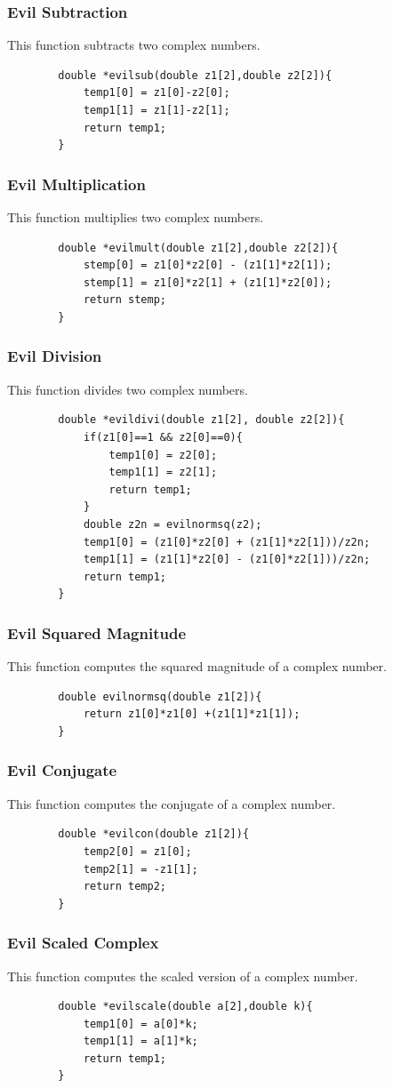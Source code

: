 \documentclass[12pt]{article}
\begin{document}
	\subsubsection{Evil Subtraction}
	This function subtracts two complex numbers.
	\begin{lstlisting}
		double *evilsub(double z1[2],double z2[2]){
			temp1[0] = z1[0]-z2[0];
			temp1[1] = z1[1]-z2[1];
			return temp1;
		}
	\end{lstlisting}
	\subsubsection{Evil Multiplication}
	This function multiplies two complex numbers.
	\begin{lstlisting}
		double *evilmult(double z1[2],double z2[2]){
			stemp[0] = z1[0]*z2[0] - (z1[1]*z2[1]);
			stemp[1] = z1[0]*z2[1] + (z1[1]*z2[0]);
			return stemp;
		}
	\end{lstlisting}
	\subsubsection{Evil Division}
	This function divides two complex numbers.
	\begin{lstlisting}
		double *evildivi(double z1[2], double z2[2]){
			if(z1[0]==1 && z2[0]==0){
				temp1[0] = z2[0];
				temp1[1] = z2[1];
				return temp1;
			}
			double z2n = evilnormsq(z2);
			temp1[0] = (z1[0]*z2[0] + (z1[1]*z2[1]))/z2n;
			temp1[1] = (z1[1]*z2[0] - (z1[0]*z2[1]))/z2n;
			return temp1;
		}
	\end{lstlisting}
		\subsubsection{Evil Squared Magnitude}
	This function computes the squared magnitude of a complex number.
	\begin{lstlisting}
		double evilnormsq(double z1[2]){
			return z1[0]*z1[0] +(z1[1]*z1[1]);
		}
	\end{lstlisting}
	\subsubsection{Evil Conjugate}
	This function computes the conjugate of a complex number.
	\begin{lstlisting}
		double *evilcon(double z1[2]){
			temp2[0] = z1[0];
			temp2[1] = -z1[1]; 
			return temp2;
		}
	\end{lstlisting}
	\subsubsection{Evil Scaled Complex}
	This function computes the scaled version of a complex number.
	\begin{lstlisting}
		double *evilscale(double a[2],double k){
			temp1[0] = a[0]*k;
			temp1[1] = a[1]*k;
			return temp1;
		} 
	\end{lstlisting}
\end{document}
